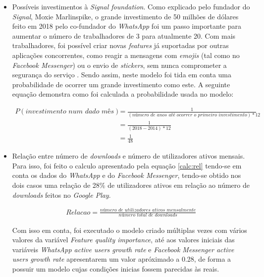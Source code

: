 \begin{itemize}
   \item Possíveis investimentos à \textit{Signal foundation}. Como explicado pelo fundador do \textit{Signal}, Moxie Marlinspike, o grande investimento de 50 milhões de dólares feito em 2018 pelo co-fundador do \textit{WhatsApp} foi um passo importante para aumentar o número de trabalhadores de 3 para atualmente 20. Com mais trabalhadores, foi possível criar novas \textit{features} já suportadas por outras aplicações concorrentes, como reagir a mensagens com \textit{emojis} (tal como no \textit{Facebook Messenger}) ou o envio de \textit{stickers}, sem nunca comprometer a segurança do serviço \cite{wired_signal}. Sendo assim, neste modelo foi tida em conta uma probabilidade de ocorrer um grande investimento como este. A seguinte equação demonstra como foi calculada a probabilidade usada no modelo:
   
   \begin{equation}
      \begin{split}
         P(\textit{investimento num dado mês}) & = \frac{1}{(\textit{número de anos até ocorrer o primeiro investimento})*12} \\
         & = \frac{1}{(2018-2014)*12} \\
         & = \frac{1}{48}
      \end{split}
  \end{equation}

  \item Relação entre número de \textit{downloads} e número de utilizadores ativos mensais. Para isso, foi feito o calculo apresentado pela equação \ref{calc:rel} tendo-se em conta os dados do \textit{WhatsApp} e do \textit{Facebook Messenger}, tendo-se obtido nos dois casos uma relação de 28\% de utilizadores ativos em relação ao número de \textit{downloads} feitos no \textit{Google Play}.
  
  \begin{equation}
      \label{calc:rel}
      \begin{split}
         Relacao = \frac{\textit{número de utilizadores ativos mensalmente}}{\textit{número total de downloads}}
      \end{split}
   \end{equation}

   Com isso em conta, foi executado o modelo criado múltiplas vezes com vários valores da variável \textit{Feature quality importance}, até aos valores iniciais das variáveis \textit{WhatsApp active users growth rate} e \textit{Facebook Messenger active users growth rate} apresentarem um valor apróximado a 0.28, de forma a possuir um modelo cujas condições inicias fossem parecidas às reais.


\end{itemize}
